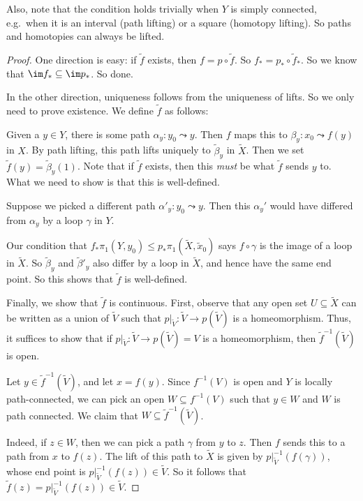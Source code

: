 \documentclass[a4paper]{article}
\begin{document}
Also, note that the condition holds trivially when $Y$ is simply connected, e.g.\ when it is an interval (path lifting) or a square (homotopy lifting). So paths and homotopies can always be lifted.

\begin{proof}
  One direction is easy: if $\tilde{f}$ exists, then $f = p \circ \tilde{f}$. So $f_* = p_* \circ \tilde{f}_*$. So we know that $\im f_* \subseteq \im p_*$. So done.

  In the other direction, uniqueness follows from the uniqueness of lifts. So we only need to prove existence. We define $\tilde{f}$ as follows:

  Given a $y \in Y$, there is some path $\alpha_y: y_0 \leadsto y$. Then $f$ maps this to $\beta_y: x_0 \leadsto f(y)$ in $X$. By path lifting, this path lifts uniquely to $\tilde{\beta}_y$ in $\tilde{X}$. Then we set $\tilde{f}(y) = \tilde{\beta}_y(1)$. Note that if $\tilde{f}$ exists, then this \emph{must} be what $\tilde{f}$ sends $y$ to. What we need to show is that this is well-defined.

  Suppose we picked a different path $\alpha'_y: y_0 \leadsto y$. Then this $\alpha_y'$ would have differed from $\alpha_y$ by a loop $\gamma$ in $Y$.

  Our condition that $f_* \pi_1(Y, y_0) \leq p_*\pi_1(\tilde{X}, \tilde{x}_0)$ says $f\circ \gamma$ is the image of a loop in $\tilde{X}$. So $\tilde{\beta}_y$ and $\tilde{\beta}'_y$ also differ by a loop in $\tilde{X}$, and hence have the same end point. So this shows that $\tilde{f}$ is well-defined.

  Finally, we show that $\tilde{f}$ is continuous. First, observe that any open set $U \subseteq \tilde{X}$ can be written as a union of $\tilde{V}$ such that $p|_{\tilde{V}}: \tilde{V} \to p(\tilde{V})$ is a homeomorphism. Thus, it suffices to show that if $p|_{\tilde{V}}: \tilde{V} \to p(\tilde{V}) = V$ is a homeomorphism, then $\tilde{f}^{-1}(\tilde{V})$ is open.

  Let $y \in \tilde{f}^{-1}(\tilde{V})$, and let $x = f(y)$. Since $f^{-1}(V)$ is open and $Y$ is locally path-connected, we can pick an open $W \subseteq f^{-1}(V)$ such that $y \in W$ and $W$ is path connected. We claim that $W \subseteq \tilde{f}^{-1}(\tilde{V})$.

  Indeed, if $z \in W$, then we can pick a path $\gamma$ from $y$ to $z$. Then $f$ sends this to a path from $x$ to $f(z)$. The lift of this path to $\tilde{X}$ is given by $p|_{\tilde{V}}^{-1} (f(\gamma))$, whose end point is $p|_{\tilde{V}}^{-1}(f(z)) \in \tilde{V}$. So it follows that $\tilde{f}(z) = p|_{\tilde{V}}^{-1}(f(z)) \in \tilde{V}$.

\end{proof}
\end{document}
